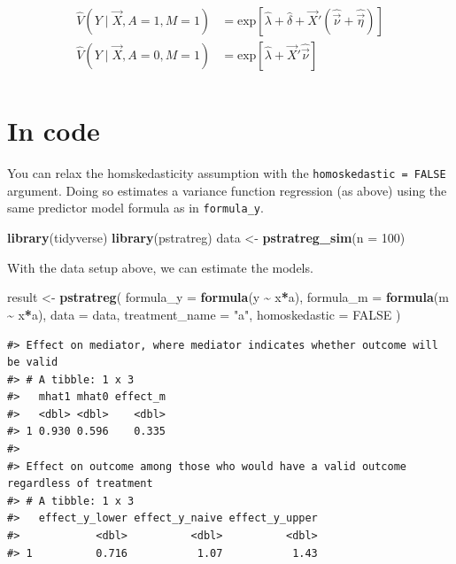 \documentclass[
]{book}
\newenvironment{Shaded}{\begin{snugshade}}{\end{snugshade}}
\newcommand{\AttributeTok}[1]{\textcolor[rgb]{0.13,0.29,0.53}{#1}}
\newcommand{\ConstantTok}[1]{\textcolor[rgb]{0.56,0.35,0.01}{#1}}
\newcommand{\DecValTok}[1]{\textcolor[rgb]{0.00,0.00,0.81}{#1}}
\newcommand{\FunctionTok}[1]{\textcolor[rgb]{0.13,0.29,0.53}{\textbf{#1}}}
\newcommand{\NormalTok}[1]{#1}
\newcommand{\OtherTok}[1]{\textcolor[rgb]{0.56,0.35,0.01}{#1}}
\newcommand{\SpecialCharTok}[1]{\textcolor[rgb]{0.81,0.36,0.00}{\textbf{#1}}}
\newcommand{\StringTok}[1]{\textcolor[rgb]{0.31,0.60,0.02}{#1}}
\begin{document}
\[\begin{aligned}
\hat{V}(Y\mid \vec{X},A = 1,M=1) &= \text{exp}\left[\hat\lambda + \hat\delta  + \vec{X}'\left(\hat{\vec\nu} + \hat{\vec\eta}\right)\right] \\
\hat{V}(Y\mid \vec{X},A = 0,M=1) &= \text{exp}\left[\hat\lambda + \vec{X}'\hat{\vec\nu}\right] \\
\end{aligned}\]

\hypertarget{in-code}{%
\section{In code}\label{in-code}}

You can relax the homskedasticity assumption with the \texttt{homoskedastic\ =\ FALSE} argument. Doing so estimates a variance function regression (as above) using the same predictor model formula as in \texttt{formula\_y}.

\begin{Shaded}
\begin{Highlighting}[]
\FunctionTok{library}\NormalTok{(tidyverse)}
\FunctionTok{library}\NormalTok{(pstratreg)}
\NormalTok{data }\OtherTok{\textless{}{-}} \FunctionTok{pstratreg\_sim}\NormalTok{(}\AttributeTok{n =} \DecValTok{100}\NormalTok{)}
\end{Highlighting}
\end{Shaded}

With the data setup above, we can estimate the models.

\begin{Shaded}
\begin{Highlighting}[]
\NormalTok{result }\OtherTok{\textless{}{-}} \FunctionTok{pstratreg}\NormalTok{(}
  \AttributeTok{formula\_y =} \FunctionTok{formula}\NormalTok{(y }\SpecialCharTok{\textasciitilde{}}\NormalTok{ x}\SpecialCharTok{*}\NormalTok{a),}
  \AttributeTok{formula\_m =} \FunctionTok{formula}\NormalTok{(m }\SpecialCharTok{\textasciitilde{}}\NormalTok{ x}\SpecialCharTok{*}\NormalTok{a),}
  \AttributeTok{data =}\NormalTok{ data,}
  \AttributeTok{treatment\_name =} \StringTok{"a"}\NormalTok{,}
  \AttributeTok{homoskedastic =} \ConstantTok{FALSE}
\NormalTok{)}
\end{Highlighting}
\end{Shaded}

\begin{verbatim}
#> Effect on mediator, where mediator indicates whether outcome will be valid
#> # A tibble: 1 x 3
#>   mhat1 mhat0 effect_m
#>   <dbl> <dbl>    <dbl>
#> 1 0.930 0.596    0.335
#> 
#> Effect on outcome among those who would have a valid outcome regardless of treatment
#> # A tibble: 1 x 3
#>   effect_y_lower effect_y_naive effect_y_upper
#>            <dbl>          <dbl>          <dbl>
#> 1          0.716           1.07           1.43
\end{verbatim}
\end{document}
